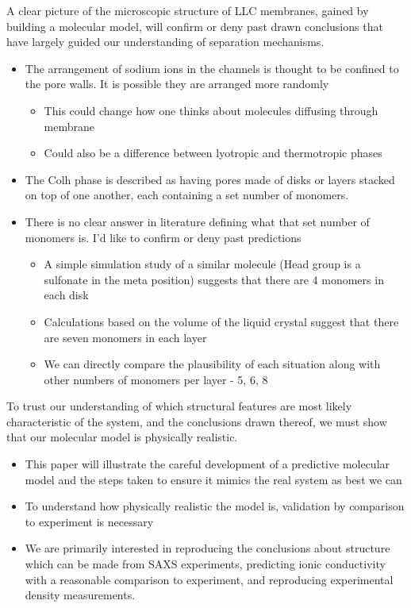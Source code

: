 \documentclass{article}
\begin{document}
	A clear picture of the microscopic structure of LLC membranes, gained by building a molecular model, will confirm or deny past drawn conclusions that have largely guided our understanding of separation mechanisms. 
	\begin{itemize}
		\item The arrangement of sodium ions in the channels is thought to be confined to the pore walls. It is possible they are arranged more randomly
		\begin{itemize}
			\item This could change how one thinks about molecules diffusing through membrane
			\item Could also be a difference between lyotropic and thermotropic phases
		\end{itemize}
		\item The Colh phase is described as having pores made of disks or layers stacked on top of one another, each containing a set number of monomers. 
		\item There is no clear answer in literature defining what that set number of monomers is. I'd like to confirm or deny past predictions
		\begin{itemize}
			\item A simple simulation study of a similar molecule (Head group is a sulfonate in the meta position) suggests that there are 4 monomers in each disk
			\item Calculations based on the volume of the liquid crystal suggest that there are seven monomers in each layer
			\item We can directly compare the plausibility of each situation along with other numbers of monomers per layer - 5, 6, 8
		\end{itemize}
	\end{itemize}
	

	To trust our understanding of which structural features are most likely characteristic of the system, and the conclusions drawn thereof, we must show that our molecular model is physically realistic.   
	\begin{itemize}
		\item This paper will illustrate the careful development of a predictive molecular model and the steps taken to ensure it mimics the real system as best we can 
		\item To understand how physically realistic the model is, validation by comparison to experiment is necessary
		\item We are primarily interested in reproducing the conclusions about structure which can be made from SAXS experiments, predicting ionic conductivity with a reasonable comparison to experiment, and reproducing experimental density measurements.          
	\end{itemize}
	
\end{document}
